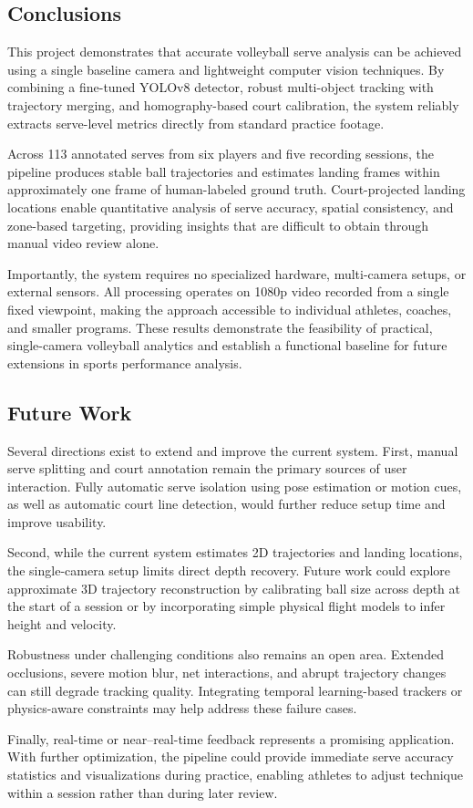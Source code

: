 \subsection{Conclusions}
This project demonstrates that accurate volleyball serve analysis can be achieved using a single baseline camera and lightweight computer vision techniques. By combining a fine-tuned YOLOv8 detector, robust multi-object tracking with trajectory merging, and homography-based court calibration, the system reliably extracts serve-level metrics directly from standard practice footage.

Across 113 annotated serves from six players and five recording sessions, the pipeline produces stable ball trajectories and estimates landing frames within approximately one frame of human-labeled ground truth. Court-projected landing locations enable quantitative analysis of serve accuracy, spatial consistency, and zone-based targeting, providing insights that are difficult to obtain through manual video review alone.

Importantly, the system requires no specialized hardware, multi-camera setups, or external sensors. All processing operates on 1080p video recorded from a single fixed viewpoint, making the approach accessible to individual athletes, coaches, and smaller programs. These results demonstrate the feasibility of practical, single-camera volleyball analytics and establish a functional baseline for future extensions in sports performance analysis.

\subsection{Future Work}
Several directions exist to extend and improve the current system. First, manual serve splitting and court annotation remain the primary sources of user interaction. Fully automatic serve isolation using pose estimation or motion cues, as well as automatic court line detection, would further reduce setup time and improve usability.

Second, while the current system estimates 2D trajectories and landing locations, the single-camera setup limits direct depth recovery. Future work could explore approximate 3D trajectory reconstruction by calibrating ball size across depth at the start of a session or by incorporating simple physical flight models to infer height and velocity.

Robustness under challenging conditions also remains an open area. Extended occlusions, severe motion blur, net interactions, and abrupt trajectory changes can still degrade tracking quality. Integrating temporal learning-based trackers or physics-aware constraints may help address these failure cases.

Finally, real-time or near–real-time feedback represents a promising application. With further optimization, the pipeline could provide immediate serve accuracy statistics and visualizations during practice, enabling athletes to adjust technique within a session rather than during later review.
